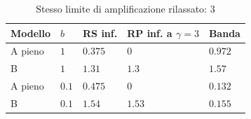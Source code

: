 \begin{table}[htbp]\centering\small
\begin{tabular}{lllll}\toprule
Modello & $b$ & RS inf. & RP inf. a $\gamma=3$ & Banda\\\midrule
A pieno & $1$ & $0.375$ & $0$ & $0.972$\\
B & $1$ & $1.31$ & $1.3$ & $1.57$\\
A pieno & $0.1$ & $0.475$ & $0$ & $0.132$\\
B & $0.1$ & $1.54$ & $1.53$ & $0.155$\\
\bottomrule\end{tabular}
\caption{Stesso limite di amplificazione rilassato: 3}
\end{table}
